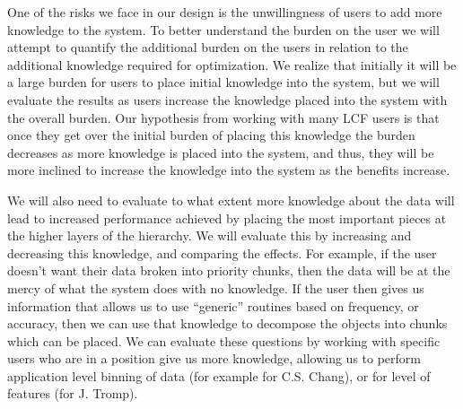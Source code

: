 One of the risks we face in our design is the unwillingness of users to add
more knowledge to the system. To better understand the burden on the user we
will attempt to quantify the additional burden on the users in relation to
the additional knowledge required for optimization. 
 We realize that initially it will be a large burden for users to
place initial knowledge into the system, but we will evaluate the results as
users increase the knowledge placed into the system with the overall burden.
Our hypothesis from working with many LCF users is that once they get over
the initial burden of placing this knowledge the burden decreases as more
knowledge is placed into the system, and thus, they will be more inclined to
increase the knowledge into the system as the benefits increase.

We will also need to evaluate to what extent more knowledge about
the data will lead to increased performance achieved by placing the most important pieces at the
higher layers of the hierarchy. We will evaluate this by increasing and
decreasing this knowledge, and comparing the effects. For example, if the user doesn't want their data
broken into priority chunks, then the data will be at the mercy of what the
system does with no knowledge. If the user then gives us information that
allows us to use ``generic'' routines based on frequency, or accuracy, then
we can use that knowledge to decompose the objects into chunks which can be
placed. We can evaluate these questions by working with specific users who
are in a position give us more knowledge,
allowing us to perform application level binning of data (for example
for C.S. Chang), or for level of features (for J. Tromp).







